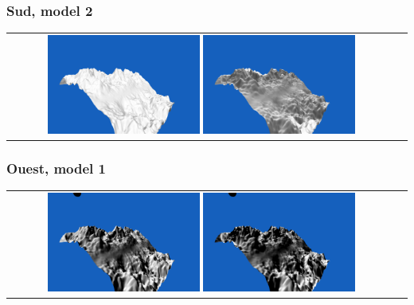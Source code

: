 \documentclass[a4paper]{article}
\begin{document}
\subsubsection{Sud, model 2}
\begin{tabular}{cc}
\includegraphics[width=0.4\textwidth]{Images/Essais/Essai_11_phong_South_1.png}
\includegraphics[width=0.4\textwidth]{Images/Essais/Essai_11_slint_South_1.png}
\end{tabular}
\subsubsection{Ouest, model 1}
\begin{tabular}{cc}
\includegraphics[width=0.4\textwidth]{Images/Essais/Essai_11_phong_West_0.png}
\includegraphics[width=0.4\textwidth]{Images/Essais/Essai_11_slint_West_0.png}
\end{tabular}
\end{document}
